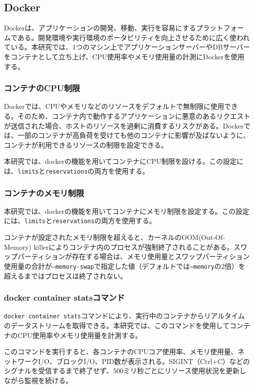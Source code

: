 \documentclass[../../../main]{subfiles}
\begin{document}
    \subsection{Docker}\label{subsec:phraseology-docker}

    Dockerは、アプリケーションの開発、移動、実行を容易にするプラットフォームである。開発環境や実行環境のポータビリティを向上させるために広く使われている。本研究では、1つのマシン上でアプリケーションサーバーやDBサーバーをコンテナとして立ち上げ、CPU使用率やメモリ使用量の計測にDockerを使用する。\cite{Docker概要}

    \subsubsection{コンテナのCPU制限}\label{subsubsec:phraseology-docker-cpu-limit}

    Dockerでは、CPUやメモリなどのリソースをデフォルトで無制限に使用できる。そのため、コンテナ内で動作するアプリケーションに悪意のあるリクエストが送信された場合、ホストのリソースを過剰に消費するリスクがある。Dockerでは、一部のコンテナが高負荷を受けても他のコンテナに影響が及ばないように、コンテナが利用できるリソースの制限を設定できる。\cite{DockerKubernetes}

    本研究では、dockerの機能を用いてコンテナにCPU制限を設ける。この設定には、\texttt{limits}と\texttt{reservations}の両方を使用する。\cite{Docker制限}

    \subsubsection{コンテナのメモリ制限}\label{subsubsec:phraseology-docker-memory-limit}

    本研究では、dockerの機能を用いてコンテナにメモリ制限を設定する。この設定には、\texttt{limits}と\texttt{reservations}の両方を使用する。\cite{Docker制限}

    コンテナが設定されたメモリ制限を超えると、カーネルのOOM(Out-Of-Memory) killerによりコンテナ内のプロセスが強制終了されることがある。スワップパーティションが存在する場合は、メモリ使用量とスワップパーティション使用量の合計が\texttt{--memory-swap}で指定した値（デフォルトでは\texttt{--memory}の2倍）を超えるまではプロセスは終了されない。\cite{DockerKubernetes}

    \subsubsection{docker container statsコマンド}\label{subsubsec:phraseology-docker-container-stats}

    \texttt{docker container stats}コマンドにより、実行中のコンテナからリアルタイムのデータストリームを取得できる。本研究では、このコマンドを使用してコンテナのCPU使用率やメモリ使用量を計測する。\cite{Docker Stats}

    このコマンドを実行すると、各コンテナのCPUコア使用率、メモリ使用量、ネットワークI/O、ブロックI/O、PID数が表示される。SIGINT（Ctrl+C）などのシグナルを受信するまで終了せず、500ミリ秒ごとにリソース使用状況を更新しながら監視を続ける。\cite{DockerKubernetes}
\end{document}
